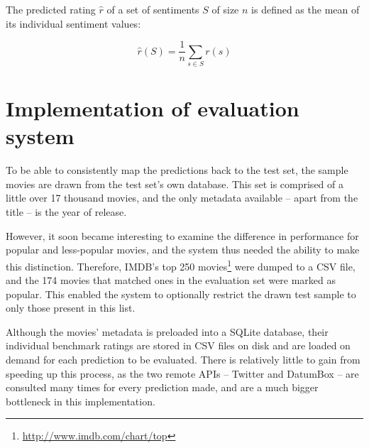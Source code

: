 The predicted rating $\hat{r}$ of a set of sentiments $S$ of size $n$ is defined as the mean of its individual sentiment values:

\begin{equation}
  \hat{r}(S) = \frac{1}{n} \sum_{s \in S} r(s)
\end{equation}


\section{Implementation of evaluation system} %
\label{sec:evaluation_impl}

To be able to consistently map the predictions back to the test set, the sample movies are drawn from the test set's own database. This set is comprised of a little over 17 thousand movies, and the only metadata available -- apart from the title -- is the year of release.

However, it soon became interesting to examine the difference in performance for popular and less-popular movies, and the system thus needed the ability to make this distinction. Therefore, IMDB's top 250 movies\footnote{\url{http://www.imdb.com/chart/top}} were dumped to a CSV file, and the 174 movies that matched ones in the evaluation set were marked as popular. This enabled the system to optionally restrict the drawn test sample to only those present in this list.

Although the movies' metadata is preloaded into a SQLite database, their individual benchmark ratings are stored in CSV files on disk and are loaded on demand for each prediction to be evaluated. There is relatively little to gain from speeding up this process, as the two remote APIs -- Twitter and DatumBox -- are consulted many times for every prediction made, and are a much bigger bottleneck in this implementation.

